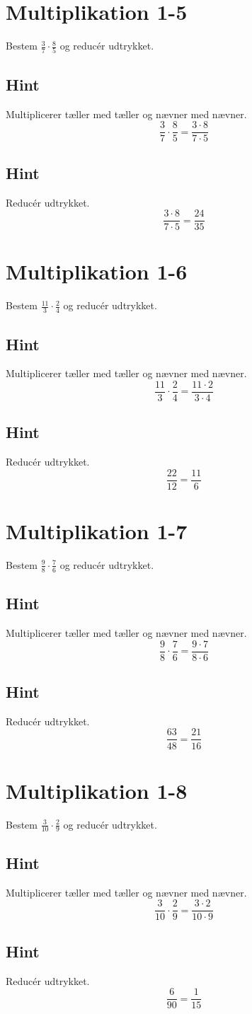 \documentclass{article}
\newenvironment{exercise}[1]{\newpage\section{#1}}{}
\newcommand{\answerbox}[1]{\fbox{$#1$}}
\newcommand{\hint}{\subsection*{Hint}}
\begin{document}
\newpage

\begin{exercise}{Multiplikation 1-5}
	
	Bestem $\frac{3}{7} \cdot \frac{8}{5}$ og reducér udtrykket.
	
	\answerbox{\frac{24}{35} }
	
	\hint
	
	Multiplicerer tæller med tæller og nævner med nævner.
	\[
	\frac{3}{7} \cdot \frac{8}{5} = \frac{3 \cdot 8}{7 \cdot 5} 
	\]
	
	\hint
	
	Reducér udtrykket.
	\[
	\frac{3 \cdot 8}{7 \cdot 5} = \frac{24}{35} 
	\]
	
	
\end{exercise}

\newpage

\begin{exercise}{Multiplikation 1-6}
	
	Bestem $\frac{11}{3} \cdot \frac{2}{4}$ og reducér udtrykket.
	
	\answerbox{\frac{11}{6}}
	
	\hint
	
	Multiplicerer tæller med tæller og nævner med nævner.
	\[
	\frac{11}{3} \cdot \frac{2}{4}= \frac{11 \cdot 2}{3 \cdot 4} 
	\]
	
	\hint
	
	Reducér udtrykket.
	\[
	\frac{22}{12} = \frac{11}{6}
	\]
	
	
\end{exercise}

\newpage

\begin{exercise}{Multiplikation 1-7}
	
	Bestem $\frac{9}{8} \cdot \frac{7}{6}$ og reducér udtrykket.
	
	\answerbox{ \frac{21}{16}}
	
	\hint
	
	Multiplicerer tæller med tæller og nævner med nævner.
	\[
	\frac{9}{8} \cdot \frac{7}{6} = \frac{9 \cdot 7}{8 \cdot 6} 
	\]
	
	\hint
	
	Reducér udtrykket.
	\[
	\frac{63}{48} = \frac{21}{16}
	\]
	
	
\end{exercise}

\newpage

\begin{exercise}{Multiplikation 1-8}
	
	Bestem $\frac{3}{10} \cdot \frac{2}{9}$ og reducér udtrykket.
	
	\answerbox{\frac{1}{15}}
	
	\hint
	
	Multiplicerer tæller med tæller og nævner med nævner.
	\[
	\frac{3}{10} \cdot \frac{2}{9} = \frac{3 \cdot 2}{10 \cdot 9} 
	\]
	
	\hint
	
	Reducér udtrykket.
	\[
	\frac{6}{90} = \frac{1}{15}
	\]
	
	
\end{exercise}
\end{document}
